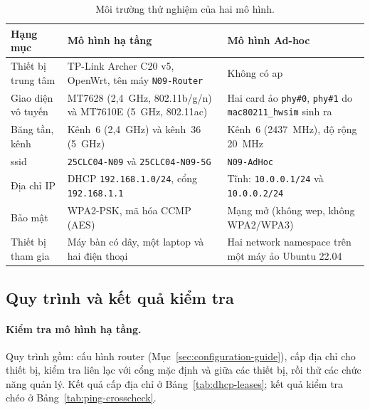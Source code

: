 \begin{table}[htbp]
  \centering\footnotesize
  \caption{Môi trường thử nghiệm của hai mô hình.}
  \label{tab:moitruong-thunghiem}
  \begin{tabularx}{\linewidth}{@{} L{0.65} L{1.2} L{1.15} @{}}
    \toprule
    \textbf{Hạng mục} & \textbf{Mô hình hạ tầng} & \textbf{Mô hình Ad-hoc} \\
    \midrule
    Thiết bị trung tâm & TP-Link Archer C20 v5, OpenWrt, tên máy
      \texttt{N09-Router} & Không có \ac{ap} \\
    Giao diện vô tuyến & MT7628 (2,4~GHz, 802.11b/g/n) và MT7610E (5~GHz,
      802.11ac) & Hai card ảo \texttt{phy\#0}, \texttt{phy\#1} do
      \texttt{mac80211\_hwsim} sinh ra \\
    Băng tần, kênh & Kênh~6 (2,4~GHz) và kênh~36 (5~GHz) & Kênh~6 (2437~MHz),
      độ rộng 20~MHz \\
    \ac{ssid} & \texttt{25CLC04-N09} và \texttt{25CLC04-N09-5G} &
      \texttt{N09-AdHoc} \\
    Địa chỉ IP & DHCP \texttt{192.168.1.0/24}, cổng \texttt{192.168.1.1} &
      Tĩnh: \texttt{10.0.0.1/24} và \texttt{10.0.0.2/24} \\
    Bảo mật & WPA2-PSK, mã hóa CCMP (AES) & Mạng mở (không \ac{wep}, không
      WPA2/WPA3) \\
    Thiết bị tham gia & Máy bàn có dây, một laptop và hai điện thoại & Hai
      network namespace trên một máy ảo Ubuntu 22.04 \\
    \bottomrule
  \end{tabularx}
\end{table}

\subsection{Quy trình và kết quả kiểm tra}

\paragraph{Kiểm tra mô hình hạ tầng.} Quy trình gồm: cấu hình router
(Mục~\ref{sec:configuration-guide}), cấp địa chỉ cho thiết bị, kiểm tra liên lạc
với cổng mặc định và giữa các thiết bị, rồi thử các chức năng quản lý. Kết quả
cấp địa chỉ ở Bảng~\ref{tab:dhcp-leases}; kết quả kiểm tra chéo ở
Bảng~\ref{tab:ping-crosscheck}.

